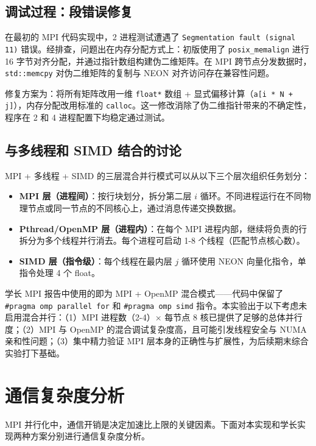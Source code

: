 \documentclass[a4paper]{article}
\begin{document}
\subsection{调试过程：段错误修复}

在最初的 MPI 代码实现中，2 进程测试遭遇了 \texttt{Segmentation fault (signal 11)} 错误。经排查，问题出在内存分配方式上：初版使用了 \texttt{posix\_memalign} 进行 16 字节对齐分配，并通过指针数组构建伪二维矩阵。在 MPI 跨节点分发数据时，\texttt{std::memcpy} 对伪二维矩阵的复制与 NEON 对齐访问存在兼容性问题。

修复方案为：将所有矩阵改用一维 \texttt{float*} 数组 + 显式偏移计算（\texttt{a[i * N + j]}），内存分配改用标准的 \texttt{calloc}。这一修改消除了伪二维指针带来的不确定性，程序在 2 和 4 进程配置下均稳定通过测试。

\subsection{与多线程和 SIMD 结合的讨论}

MPI + 多线程 + SIMD 的三层混合并行模式可以从以下三个层次组织任务划分：

\begin{itemize}
    \item \textbf{MPI 层（进程间）}：按行块划分，拆分第二层 $i$ 循环。不同进程运行在不同物理节点或同一节点的不同核心上，通过消息传递交换数据。
    \item \textbf{Pthread/OpenMP 层（进程内）}：在每个 MPI 进程内部，继续将负责的行拆分为多个线程并行消去。每个进程可启动 1-8 个线程（匹配节点核心数）。
    \item \textbf{SIMD 层（指令级）}：每个线程在最内层 $j$ 循环使用 NEON 向量化指令，单指令处理 4 个 float。
\end{itemize}

学长 MPI 报告中使用的即为 MPI + OpenMP 混合模式——代码中保留了 \texttt{\#pragma omp parallel for} 和 \texttt{\#pragma omp simd} 指令。本实验出于以下考虑未启用混合并行：（1）MPI 进程数（2-4）× 每节点 8 核已提供了足够的总体并行度；（2）MPI 与 OpenMP 的混合调试复杂度高，且可能引发线程安全与 NUMA 亲和性问题；（3）集中精力验证 MPI 层本身的正确性与扩展性，为后续期末综合实验打下基础。

\section{通信复杂度分析}

MPI 并行化中，通信开销是决定加速比上限的关键因素。下面对本实现和学长实现两种方案分别进行通信复杂度分析。
\end{document}
